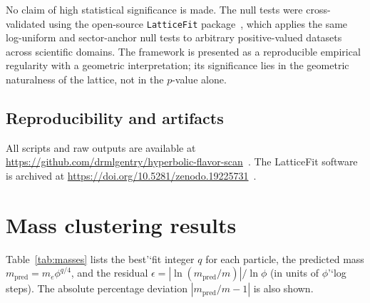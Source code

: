 ﻿\documentclass[12pt]{article}
\theoremstyle{definition}
\begin{document}
No claim of high statistical significance is made. The null tests were cross-validated using the open-source \texttt{LatticeFit} package~\cite{Gentry:LatticeFit}, which applies the same log-uniform and sector-anchor null tests to arbitrary positive-valued datasets across scientific domains. The framework is presented as a reproducible empirical regularity with a geometric interpretation; its significance lies in the geometric naturalness of the lattice, not in the $p$-value alone.

\subsection{Reproducibility and artifacts}
All scripts and raw outputs are available at \url{https://github.com/drmlgentry/hyperbolic-flavor-scan}~\cite{Gentry:Scan}. The LatticeFit software is archived at \url{https://doi.org/10.5281/zenodo.19225731}~\cite{Gentry:LatticeFit}.

\section{Mass clustering results}
\label{sec:mass_results}

Table~\ref{tab:masses} lists the best'`fit integer $q$ for each particle, the predicted mass $m_{\text{pred}} = m_e \phi^{q/4}$, and the residual $\epsilon = |\ln(m_{\text{pred}}/m)|/\ln\phi$ (in units of $\phi$'`log steps). The absolute percentage deviation $|m_{\text{pred}}/m - 1|$ is also shown.
\end{document}
